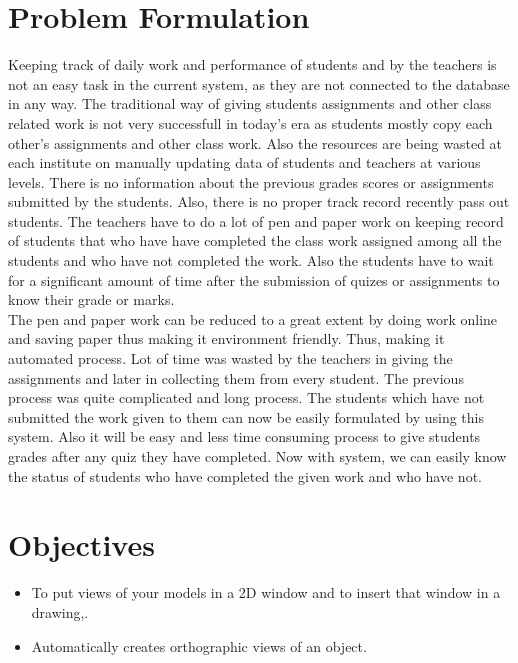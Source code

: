 \section{Problem Formulation}
Keeping track of daily work and performance of students and by the teachers is not an easy task in the current system, as they are not
connected to the database in any way. The traditional way of giving students assignments and other class related work is not very successfull in today's era as students mostly copy each other's assignments and other class work. Also the resources are being wasted
at each institute on manually updating data of students and teachers at various levels. There is no information about the
previous grades scores or assignments submitted by the students. Also, there is no proper track record recently pass out students. The teachers have to do a lot of pen and paper work on keeping record of students that who have have completed the class work assigned among all the students and who have not completed the work. Also the students have to wait for a significant amount of time after the submission of quizes or assignments to know their grade or marks.\\

\noindent The pen and paper work can be reduced to a great extent by doing work online and saving paper thus
making it environment friendly. Thus, making it automated process. Lot of time was wasted by the teachers in giving the assignments and later in collecting them from every student. The
previous process was quite complicated and long process. The students which have not submitted the work given to them can now be easily formulated by using this system.
Also it will be easy and less time consuming process to give students grades after any quiz they have completed. Now with system, we can easily know the status of students who have completed the given work and who have not.

\section{Objectives}
\begin{itemize}
\item To put views of your models in a 2D window and to insert that window in a drawing,.
\item Automatically creates orthographic views of an object.
\end{itemize}
